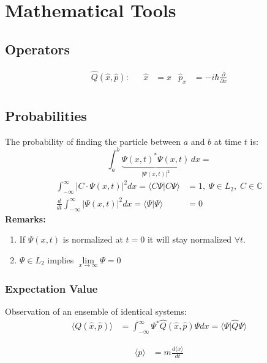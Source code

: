 \section{Mathematical Tools}

\subsection{Operators}
\noindent\begin{align*}
    \hat{Q}(\hat{x},\hat{p}): &  & \widehat{x} & =x & \widehat{p}_x & = -i\hbar \frac{\partial}{\partial x} \\
\end{align*}

\subsection{Probabilities}
The probability of finding the particle between $a$ and $b$ at time $t$ is:
\begin{equation*}
    \int_a^b \underbrace{{\Psi(x,t)}^*\Psi(x,t)}_{|\Psi(x,t)|^2}\,dx =
\end{equation*}
\begin{align*}
    \int_{-\infty}^{\infty} |C\cdot \Psi(x,t)|^2 dx                                 = \langle C\Psi|C\Psi\rangle & = 1,\;\Psi\in L_2, \; C\in\mathbb{C} \\
    \frac{d}{dt}\int_{-\infty}^{\infty} |\Psi(x,t)|^2 dx = \langle\Psi|\Psi\rangle                               & = 0
\end{align*}
\textbf{Remarks:}
\begin{enumerate}
    \item If $\Psi(x,t)$ is normalized at $t=0$ it will stay normalized $\forall t$.
    \item $\Psi \in L_2$ implies $\lim \limits_{x \to \infty}\Psi=0$
\end{enumerate}

\subsubsection{Expectation Value}
Observation of an ensemble of identical systems:
\noindent\begin{align*}
    \langle Q(\hat{x},\hat{p})\rangle & = \int_{-\infty}^{\infty}\Psi^*\hat{Q}(\hat{x},\hat{p})\Psi dx = \langle\Psi|\widehat{Q}\Psi\rangle
\end{align*}

\noindent\begin{align*}
    \langle p \rangle & = m \frac{d\langle x \rangle}{dt}
\end{align*}

